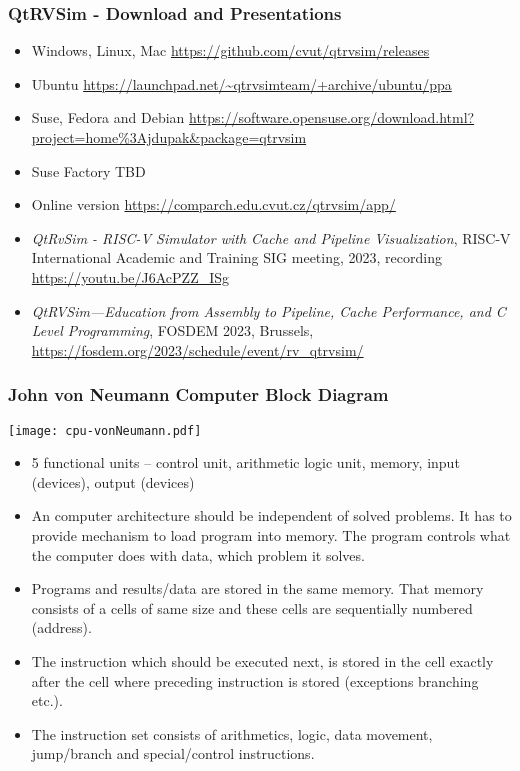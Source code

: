 \documentclass{beamer}
\begin{document}
\begin{frame}
\frametitle{QtRVSim - Download and Presentations}
\begin{itemize}
\item Windows, Linux, Mac \url{https://github.com/cvut/qtrvsim/releases}
\item  Ubuntu \url{https://launchpad.net/~qtrvsimteam/+archive/ubuntu/ppa}
\item Suse, Fedora and Debian \url{https://software.opensuse.org/download.html?project=home\%3Ajdupak\&package=qtrvsim}
\item Suse Factory TBD
\item Online version \url{https://comparch.edu.cvut.cz/qtrvsim/app/}
\item \textit{QtRvSim - RISC-V Simulator with Cache and Pipeline Visualization}, RISC-V International Academic and Training SIG meeting, 2023, recording \url{https://youtu.be/J6AcPZZ_ISg}
\item \textit{QtRVSim—Education from Assembly to Pipeline, Cache Performance, and C Level Programming}, FOSDEM 2023, Brussels, \url{https://fosdem.org/2023/schedule/event/rv_qtrvsim/}
\end{itemize}
\end{frame}

\begin{frame}[shrink=10]
\frametitle{John von Neumann Computer Block Diagram}
\begin{center}
\texttt{[image: cpu-vonNeumann.pdf]}
\end{center}
\begin{itemize}
\item 5 functional units -- control unit, arithmetic logic unit, memory, input (devices), output (devices)
\item An computer architecture should be independent of solved problems. It has to provide mechanism to load program into memory. The program controls what the computer does with data, which problem it solves.
\item Programs and results/data are stored in the same memory. That memory consists of a cells of same size and these cells are sequentially numbered (address).
\item The instruction which should be executed next, is stored in the cell exactly after the cell where preceding instruction is stored (exceptions branching etc.).
\item The instruction set consists of arithmetics, logic, data movement, jump/branch and special/control instructions.
\end{itemize}
\end{frame}
\end{document}
